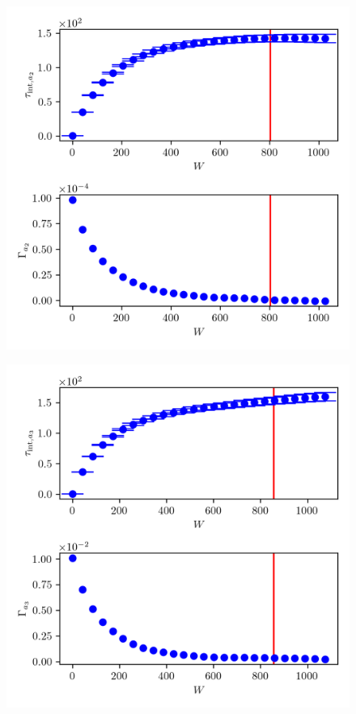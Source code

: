 \begin{figure}[ht!]
	\centering
	\includegraphics{UwerrTauIntTWalk8.png}
	\caption[]{}
	\label{fig:}
\end{figure}


\begin{figure}[ht!]
	\centering
	\includegraphics{UwerrTauIntTWalk9.png}
	\caption[]{}
	\label{fig:}
\end{figure}

